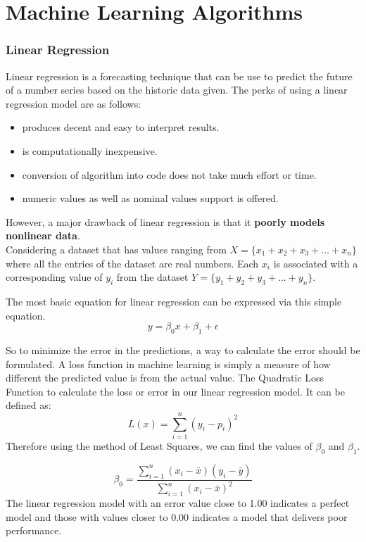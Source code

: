 \documentclass[12pt]{article}
\begin{document}
\newpage
\part{Machine Learning Algorithms}
\section{Linear Regression}
Linear regression is a forecasting technique that can be use to predict the future of a number series based on the historic data given. The perks of using a linear regression model are as follows:

\begin{itemize}
  \item produces decent and  easy to interpret results.
  \item is computationally inexpensive.
  \item conversion of algorithm into code does not take much effort or time.
  \item numeric values as well as nominal values support is offered.
\end{itemize}

However, a major drawback of linear regression is that it \textbf{poorly models nonlinear data}.
\\
Considering a dataset that has values ranging from 
$X = \lbrace x_{1}+x_{2}+x_{3}+...+x_{n} \rbrace$ where
all the entries of the dataset are real numbers. Each $x_{i}$ is associated with a corresponding value of $y_{i}$ from the dataset $Y = \lbrace y_{1}+y_{2}+y_{3}+...+y_{n} \rbrace$.

The most basic equation for linear regression can be expressed via this simple equation.
$$y = \beta_{0}x+\beta_{1}+\epsilon$$

So to minimize the error in the predictions, a way to calculate the error should be formulated. A loss function in machine learning is simply a measure of how different the predicted value is from the actual value. The Quadratic Loss Function to calculate the loss or error in our linear regression model. It can be defined as:
$$L(x) = \sum_{i=1}^{n}(y_{i}-p_{i})^{2} $$
Therefore using the method of Least Squares, we can find the values of $\beta_{0}$ and $\beta_{1}$.

$$
\beta_{0} = \frac{\sum_{i=1}^{n} ( x_{i}-\bar{x}) (y_{i}-\bar{y})}{\sum_{i=1}^{n} ( x_{i}-\bar{x})^{2} }
$$
The linear regression model with an error value close to 1.00 indicates a perfect model and those with values closer to 0.00 indicates a model that delivers poor performance.
\end{document}
